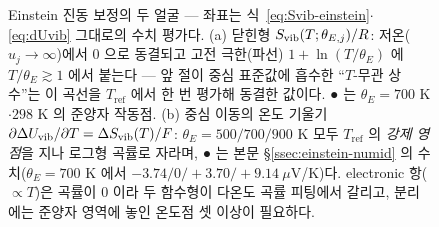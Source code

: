 \begin{figure}[t]
\caption{Einstein 진동 보정의 두 얼굴 --- 좌표는 식~\eqref{eq:Svib-einstein}$\cdot$\eqref{eq:dUvib}
그대로의 수치 평가다. (a) 닫힌형 $S_{\mathrm{vib}}(T;\theta_{E,j})/R$: 저온($u_j\to\infty$)에서 $0$ 으로
동결되고 고전 극한(파선) $1+\ln(T/\theta_E)$ 에 $T/\theta_E\gtrsim1$ 에서 붙는다 --- 앞 절이 중심
표준값에 흡수한 ``$T$-무관 상수''는 이 곡선을 $T_\mathrm{ref}$ 에서 한 번 평가해 동결한 값이다.
● 는 $\theta_E{=}700$ K$\cdot$$298$ K 의 준양자 작동점. (b) 중심 이동의 온도 기울기
$\partial\Delta U_{\mathrm{vib}}/\partial T=\Delta S_{\mathrm{vib}}(T)/F$: $\theta_{E}{=}500/700/900$ K 모두
$T_\mathrm{ref}$ 의 \emph{강제 영점}을 지나 로그형 곡률로 자라며, ● 는 본문 \S\ref{ssec:einstein-numid}
의 수치($\theta_E{=}700$ K 에서 $-3.74/0/+3.70/+9.14\ \mu$V/K)다. electronic 항($\propto T$)은 곡률이 $0$
이라 두 함수형이 다온도 곡률 피팅에서 갈리고, 분리에는 준양자 영역에 놓인 온도점 셋 이상이 필요하다.}
\label{fig:svibid}
\end{figure}

